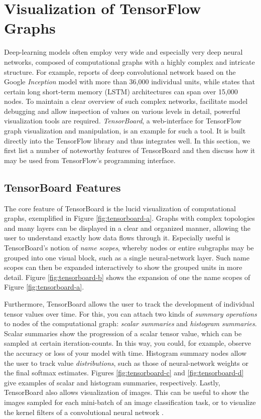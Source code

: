 \section{Visualization of TensorFlow Graphs}\label{sec:visual}

Deep-learning models often employ very wide and especially very deep neural
networks, composed of computational graphs with a highly complex and intricate
structure. For example, \cite{inception} reports of deep convolutional network
based on the Google \emph{Inception} model with more than 36,000 individual
units, while \cite{tensorflow} states that certain long short-term memory (LSTM)
architectures can span over 15,000 nodes. To maintain a clear overview of such
complex networks, facilitate model debugging and allow inspection of values on
various levels in detail, powerful visualization tools are
required. \emph{TensorBoard}, a web-interface for TensorFlow graph visualization
and manipulation, is an example for such a tool. It is built directly into the
TensorFlow library and thus integrates well. In this section, we first list a
number of noteworthy features of TensorBoard and then discuss how it may be used
from TensorFlow's programming interface.

\subsection{TensorBoard Features}\label{sec:visual-features}

The core feature of TensorBoard is the lucid visualization of computational
graphs, exemplified in Figure \ref{fig:tensorboard-a}. Graphs with complex
topologies and many layers can be displayed in a clear and organized manner,
allowing the user to understand exactly how data flows through it. Especially
useful is TensorBoard's notion of \emph{name scopes}, whereby nodes or entire
subgraphs may be grouped into one visual block, such as a single neural-network
layer. Such name scopes can then be expanded interactively to show the grouped
units in more detail. Figure \ref{fig:tensorboard-b} shows the expansion of one
the name scopes of Figure \ref{fig:tensorboard-a}.

Furthermore, TensorBoard allows the user to track the development of individual
tensor values over time. For this, you can attach two kinds of \emph{summary
  operations} to nodes of the computational graph: \emph{scalar summaries} and
\emph{histogram summaries}. Scalar summaries show the progression of a scalar
tensor value, which can be sampled at certain iteration-counts. In this way, you
could, for example, observe the accuracy or loss of your model with
time. Histogram summary nodes allow the user to track value
\emph{distributions}, such as those of neural-network weights or the final
softmax estimates. Figures \ref{fig:tensorboard-c} and \ref{fig:tensorboard-d}
give examples of scalar and histogram summaries, respectively. Lastly,
TensorBoard also allows visualization of images. This can be useful to show the
images sampled for each mini-batch of an image classification task, or to
visualize the kernel filters of a convolutional neural network
\cite{tensorflow}.

